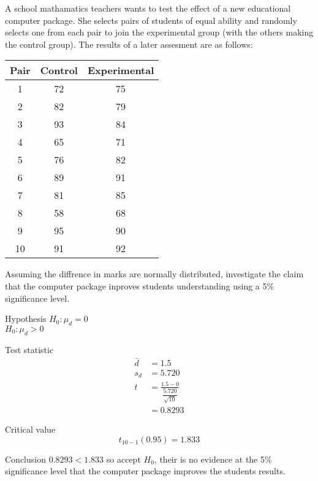         \begin{example}
        {
            A school mathamatics teachers wants to test the effect of a new educational computer package. She selects pairs of students of equal ability and randomly selects one from each pair to join the experimental group (with the others making the control group). The results of a later assesment are as follows:

            \begin{center}
            \begin{tabular}{c|c|c}
            Pair & Control & Experimental \\
            \hline
            1  & 72 & 75 \\
            2  & 82 & 79 \\
            3  & 93 & 84 \\
            4  & 65 & 71 \\
            5  & 76 & 82 \\
            6  & 89 & 91 \\
            7  & 81 & 85 \\
            8  & 58 & 68 \\
            9  & 95 & 90 \\
            10 & 91 & 92 \\
            \end{tabular}
            \end{center}

            Assuming the diffrence in marks are normally distributed, investigate the claim that the computer package inproves students understanding using a 5\% significance level.
        }

        \begin{step}{Hypothesis}
        $H_0: \mu_d = 0$\\
        $H_0: \mu_d > 0$
        \end{step}

        \begin{step}{Test statistic}
        \begin{align*}
        \bar{d} &= 1.5\\
        s_d &= 5.720\\
        t &= \frac{1.5 - 0}{\dfrac{5.720}{\sqrt{10}}}\\
        &= 0.8293
        \end{align*}
        \end{step}

        \begin{step}{Critical value}
        $$t_{10 - 1}(0.95) = 1.833$$
        \end{step}

        \begin{step}{Conclusion}
        $0.8293 < 1.833$ so accept $H_0$, their is no evidence at the 5\% significance level that the computer package improves the students results.
        \end{step}

        \end{example}
\newpage
